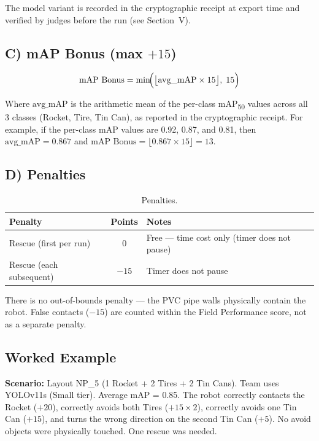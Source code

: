 \documentclass[a4]{article}
\begin{document}
The model variant is recorded in the cryptographic receipt at export time and verified by judges before the run (see Section~V).

\subsection*{C) mAP Bonus (max $+15$)}

\begin{equation*}
\text{mAP Bonus} = \min\!\Bigl(\bigl\lfloor \text{avg\_mAP} \times 15 \bigr\rfloor,\; 15\Bigr)
\end{equation*}

Where $\text{avg\_mAP}$ is the arithmetic mean of the per-class mAP\textsubscript{50} values across all 3 classes (Rocket, Tire, Tin Can), as reported in the cryptographic receipt. For example, if the per-class mAP values are 0.92, 0.87, and 0.81, then $\text{avg\_mAP} = 0.867$ and $\text{mAP Bonus} = \lfloor 0.867 \times 15 \rfloor = 13$.

\subsection*{D) Penalties}

\begin{table}[H]
\centering
\begin{tabular}{lcp{6.5cm}}
\toprule
\textbf{Penalty} & \textbf{Points} & \textbf{Notes} \\
\midrule
Rescue (first per run) & $0$ & Free --- time cost only (timer does not pause) \\
Rescue (each subsequent) & $-15$ & Timer does not pause \\
\bottomrule
\end{tabular}
\caption{Penalties.}
\end{table}

There is no out-of-bounds penalty --- the PVC pipe walls physically contain the robot. False contacts ($-15$) are counted within the Field Performance score, not as a separate penalty.

\subsection*{Worked Example}

\textbf{Scenario:} Layout NP\_5 (1 Rocket + 2 Tires + 2 Tin Cans). Team uses YOLOv11s (Small tier). Average mAP = 0.85. The robot correctly contacts the Rocket ($+20$), correctly avoids both Tires ($+15 \times 2$), correctly avoids one Tin Can ($+15$), and turns the wrong direction on the second Tin Can ($+5$). No avoid objects were physically touched. One rescue was needed.
\end{document}
